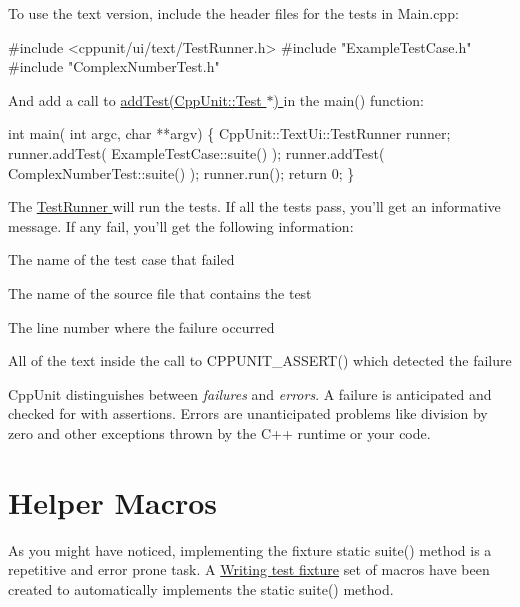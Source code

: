 \label{cppunit_cookbook_test_runner_code}%
\hypertarget{cppunit_cookbook_test_runner_code}{}%
To use the text version, include the header files for the tests in Main.\+cpp\+:


\begin{DoxyCode}
\textcolor{preprocessor}{#include <cppunit/ui/text/TestRunner.h>}
\textcolor{preprocessor}{#include "ExampleTestCase.h"}
\textcolor{preprocessor}{#include "ComplexNumberTest.h"}
\end{DoxyCode}


And add a call to \hyperlink{}{add\+Test(\+Cpp\+Unit\+::\+Test $\ast$) } in the {\ttfamily main()} function\+:


\begin{DoxyCode}
\textcolor{keywordtype}{int} main( \textcolor{keywordtype}{int} argc, \textcolor{keywordtype}{char} **argv)
\{
  CppUnit::TextUi::TestRunner runner;
  runner.addTest( ExampleTestCase::suite() );
  runner.addTest( ComplexNumberTest::suite() );
  runner.run();
  \textcolor{keywordflow}{return} 0;
\}
\end{DoxyCode}


The \hyperlink{group___executing_test}{Test\+Runner } will run the tests. If all the tests pass, you'll get an informative message. If any fail, you'll get the following information\+:


\begin{DoxyItemize}
\item The name of the test case that failed
\item The name of the source file that contains the test
\item The line number where the failure occurred
\item All of the text inside the call to C\+P\+P\+U\+N\+I\+T\+\_\+\+A\+S\+S\+E\+R\+T() which detected the failure
\end{DoxyItemize}

Cpp\+Unit distinguishes between {\itshape failures} and {\itshape errors}. A failure is anticipated and checked for with assertions. Errors are unanticipated problems like division by zero and other exceptions thrown by the C++ runtime or your code.\hypertarget{cppunit_cookbook_helper_macros}{}\section{Helper Macros}\label{cppunit_cookbook_helper_macros}
As you might have noticed, implementing the fixture static {\ttfamily suite()} method is a repetitive and error prone task. A \hyperlink{group___writing_test_fixture}{Writing test fixture} set of macros have been created to automatically implements the static {\ttfamily suite()} method.

